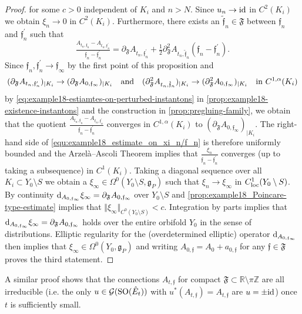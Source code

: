 \documentclass[11pt,a4paper]{scrartcl}
\newcommand*\diff{\mathop{}\!\textup{d}}
\newcommand{\id}{\textup{id}}
\newcommand{\VertC}[2]{\Vert_{C^{{#1}}{#2}}}
\newcommand{\SO}{\textup{SO}}
\numberwithin{equation}{section}
\theoremstyle{plain}
\theoremstyle{definition}
\theoremstyle{remark}
\begin{document}
\begin{proof}
for some $c>0$ independent of $K_i$ and $n>N$. Since $u_n \to \id$ in $C^2(K_i)$ we obtain $\xi_n \to 0$ in $C^2(K_i)$. Furthermore, there exists an $\tilde{\mathfrak{f}}_n\in \mathfrak{F}$ between $\mathfrak{f}_n$ and $\mathfrak{f}_n^\prime$ such that \[ \tfrac{A_{t_n,\mathfrak{f}_n}-A_{t_n,\mathfrak{f}_n^\prime}}{\mathfrak{f}_n-\mathfrak{f}_n^\prime} = \partial_\mathfrak{F} A_{t_n,\mathfrak{f}_n^\prime} + \tfrac{1}{2} \partial_\mathfrak{F}^2 A_{t_n,\tilde{\mathfrak{f}}_n} (\mathfrak{f}_n-\mathfrak{f}_n^\prime). \] Since $\mathfrak{f}_n,\mathfrak{f}_n^\prime \to \mathfrak{f}_\infty$ by the first point of this proposition and \[(\partial_\mathfrak{F} A_{t_n,\mathfrak{f}_n^\prime})_{\vert K_i} \to (\partial_\mathfrak{F} A_{0,\mathfrak{f}_\infty})_{\vert K_i} \quad \textup{and} \quad (\partial_\mathfrak{F}^2 A_{t_n,\tilde{\mathfrak{f}}_n})_{\vert K_i} \to (\partial_\mathfrak{F}^2 A_{0,\mathfrak{f}_\infty})_{\vert K_i} \quad \textup{in $C^{1,\alpha}(K_i)$} \] by \eqref{eq:example18-estiamtes-on-perturbed-instantons} in \autoref{prop:example18-existence-instantons} and the construction in \autoref{prop:pregluing-family}, we obtain that the quotient $\tfrac{A_{t_n,\mathfrak{f}_n}-A_{t_n,\mathfrak{f}_n^\prime}}{\mathfrak{f}_n-\mathfrak{f}_n^\prime}$ converges in $C^{1,\alpha}(K_i)$ to $(\partial_\mathfrak{F} A_{0,\mathfrak{f}_\infty})_{\vert K_i}$. The right-hand side of \eqref{equ:example18_estimate_on_xi_n/f_n} is therefore uniformly bounded and the Arzelà--Ascoli Theorem implies that $\tfrac{\xi_n}{\mathfrak{f}_n-\mathfrak{f}_n^\prime}$ converges (up to taking a subsequence) in $C^1(K_i)$. Taking a diagonal sequence over all $K_i \subset Y_0\setminus S$ we obtain a $\xi_\infty \in \Omega^0(Y_0\setminus  S, \mathfrak{g}_P)$ such that $\xi_n \to \xi_\infty$ in $C^1_{\textup{loc}}(Y_0\setminus S)$. By continuity $\diff_{A_{0,\mathfrak{f}_\infty}} \xi_\infty = \partial_\mathfrak{F} A_{0,\mathfrak{f}_\infty}$ over $Y_0 \setminus S$ and \autoref{prop:example18_Poincare-type-estimate} implies that $\Vert \xi_\infty \VertC{0}{(Y_0\setminus S)} < c$. Integration by parts implies that $\diff_{A_{0,\mathfrak{f}_\infty}} \xi_\infty = \partial_\mathfrak{F} A_{0,\mathfrak{f}_\infty}$ holds over the entire orbifold $Y_0$ in the sense of distributions. Elliptic regularity for the (overdetermined elliptic) operator $\diff_{A_{0,\mathfrak{f}_\infty}}$ then implies that $\xi_\infty \in \Omega^0(Y_0,\mathfrak{g}_P)$ and writing $A_{0,\mathfrak{f}} = A_0 +a_{0,\mathfrak{f}}$ for any $\mathfrak{f}\in \mathfrak{F}$ proves the third statement.
\end{proof}
\begin{remark}
A similar proof shows that the connections $A_{t,\mathfrak{f}}$ for compact $\mathfrak{F}\subset \mathbb{R}\setminus \pi \mathbb{Z}$ are all irreducible (i.e. the only $u\in \mathcal{G}(\SO(\hat{E}_t))$ with $u^*(A_{t,\mathfrak{f}})=A_{t,\mathfrak{f}}$ are $u=\pm \id$) once $t$ is sufficiently small.
\end{remark}


{}

\end{document}
